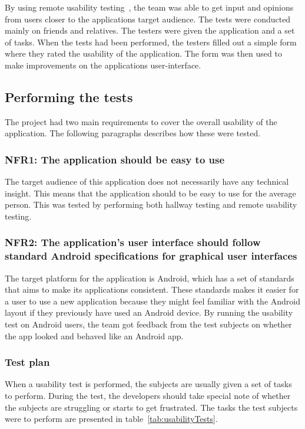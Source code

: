 
By using remote usability testing~\cite{remoteTest}, the team was able to get input and opinions from users closer to the applications target audience.
The tests were conducted mainly on friends and relatives. The testers were given the application and a set of tasks. When the tests had been performed, the testers filled out a simple form where they rated the usability of the application. The form was then used to make improvements on the applications user-interface.

\subsection{Performing the tests}
The project had two main requirements to cover the overall usability of the application. The following paragraphs describes how these were tested.

\subsubsection{NFR1: The application should be easy to use}
The target audience of this application does not necessarily have any technical insight. This means that the application should to be easy to use for the average person. This was tested by performing both hallway testing and remote usability testing.

\subsubsection{NFR2: The application's user interface should follow standard Android specifications for graphical user interfaces}
The target platform for the application is Android, which has a set of standards that aims to make its applications consistent. These standards makes it easier for a user to use a new application because they might feel familiar with the Android layout if they previously have used an Android device.
By running the usability test on Android users, the team got feedback from the test subjects on whether the app looked and behaved like an Android app.

\subsubsection{Test plan}
When a usability test is performed, the subjects are usually given a set of tasks to perform. During the test, the developers should take special note of whether the subjects are struggling or starts to get frustrated. The tasks the test subjects were to perform are presented in table~\ref{tab:usabilityTests}. 

